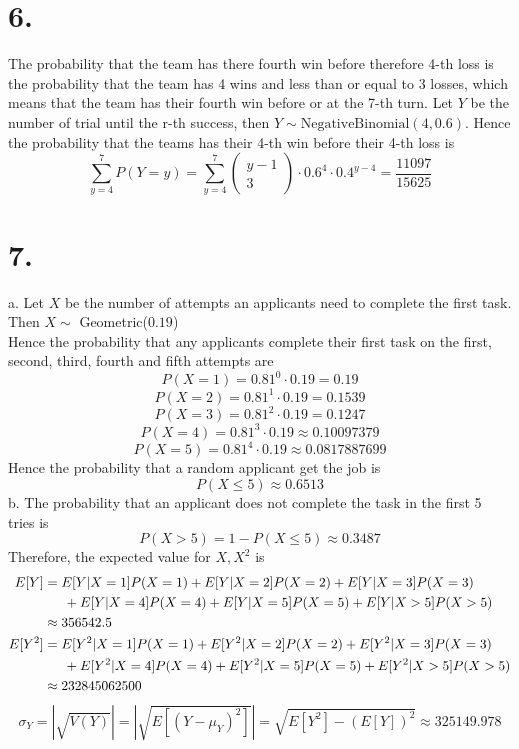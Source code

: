 \documentclass[11pt]{article}
\begin{document}
\section*{6.}
The probability that the team has there fourth win before therefore 4-th loss is the probability that the team has 4 wins and less than or equal to 3 losses, which means that the team has their fourth win before or at the 7-th turn. Let $Y$ be the number of trial until the r-th success, then $Y \sim \text{NegativeBinomial}(4,0.6)$. Hence the probability that the teams has their 4-th win before their 4-th loss is
\[
\sum_{y=4}^7 P(Y=y) = \sum_{y=4}^7 \begin{pmatrix} y-1 \\ 3 \end{pmatrix} \cdot 0.6^4 \cdot 0.4^{y-4} = \frac{11097}{15625}
\]
\pagebreak
\section*{7.}
a. Let $X$ be the number of attempts an applicants need to complete the first task. Then $X \sim$ Geometric($0.19$) \\
Hence the probability that any applicants complete their first task on the first, second, third, fourth and fifth attempts are
\[
P(X=1) = 0.81^0 \cdot 0.19 = 0.19
\]
\[
P(X=2) = 0.81^1 \cdot 0.19 = 0.1539
\]
\[
P(X=3) = 0.81^2 \cdot 0.19 = 0.1247
\]
\[
P(X=4) = 0.81^3 \cdot 0.19 \approx 0.10097379
\]
\[
P(X=5) = 0.81^4 \cdot 0.19 \approx 0.0817887699
\]
Hence the probability that a random applicant get the job is 
\[
P(X\le 5) \approx 0.6513
\]
b.
The probability that an applicant does not complete the task in the first 5 tries is 
\[
P(X>5) = 1 - P(X\le 5) \approx 0.3487
\] 
Therefore, the expected value for $X, X^2$ is 
\begin{equation*}
\begin{aligned}
E[Y] &= E[Y | X = 1] P(X = 1) + E[Y | X = 2] P(X = 2) + E[Y | X = 3] P(X = 3) \\
&\indent + E[Y | X = 4] P(X = 4) + E[Y | X = 5] P(X = 5) + E[Y| X >5] P(X>5) \\
&\approx 356542.5 \\
E[Y^2] &= E[Y^2 | X = 1] P(X = 1) + E[Y^2 | X = 2] P(X = 2) + E[Y^2 | X = 3] P(X = 3) \\
&\indent + E[Y^2 | X = 4] P(X = 4) + E[Y^2 | X = 5] P(X = 5) + E[Y^2| X >5] P(X>5) \\
&\approx 232845062500
\end{aligned}
\end{equation*}
\[
\sigma_Y = |\sqrt{V(Y)}| = |\sqrt{E[(Y-\mu_Y)^2]}| = \sqrt{E[Y^2] - (E[Y])^2} \approx 325149.978
\]
\pagebreak
\end{document}
